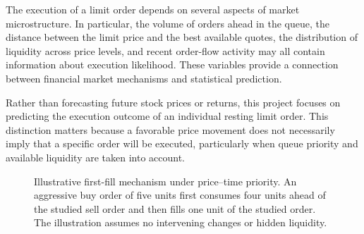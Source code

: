 \documentclass[11pt,a4paper]{article}
\begin{document}
The execution of a limit order depends on several aspects
of market microstructure. In particular, the volume of
orders ahead in the queue, the distance between the limit
price and the best available quotes, the distribution of
liquidity across price levels, and recent order-flow activity
may all contain information about execution likelihood.
These variables provide a connection between financial
market mechanisms and statistical prediction.

Rather than forecasting future stock prices or returns,
this project focuses on predicting the execution outcome
of an individual resting limit order. This distinction
matters because a favorable price movement does not
necessarily imply that a specific order will be executed,
particularly when queue priority and available liquidity
are taken into account.




\begin{figure}[htbp]
	\centering
	
	\caption{Illustrative first-fill mechanism under
		price--time priority. An aggressive buy order
		of five units first consumes four units ahead
		of the studied sell order and then fills one
		unit of the studied order. The illustration
		assumes no intervening changes or hidden liquidity.}
	
	\label{fig:lob_mechanism}
\end{figure}
\end{document}
